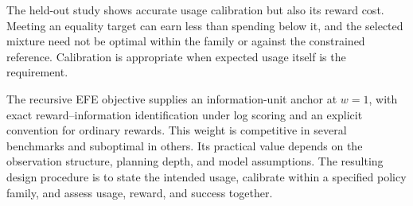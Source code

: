 The held-out study shows accurate usage calibration but also its reward cost. Meeting an equality target can earn less than spending below it, and the selected mixture need not be optimal within the family or against the constrained reference. Calibration is appropriate when expected usage itself is the requirement.

The recursive EFE objective supplies an information-unit anchor at $w=1$, with exact reward--information identification under log scoring and an explicit convention for ordinary rewards. This weight is competitive in several benchmarks and suboptimal in others. Its practical value depends on the observation structure, planning depth, and model assumptions. The resulting design procedure is to state the intended usage, calibrate within a specified policy family, and assess usage, reward, and success together.
